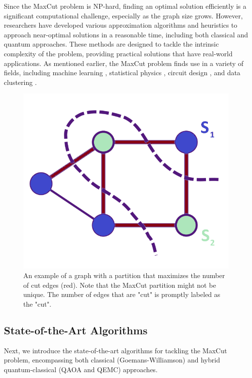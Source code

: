 Since the MaxCut problem is NP-hard, finding an optimal solution efficiently is a significant computational challenge, especially as the graph size grows. However, researchers have developed various approximation algorithms and heuristics to approach near-optimal solutions in a reasonable time, including both classical and quantum approaches. These methods are designed to tackle the intrinsic complexity of the problem, providing practical solutions that have real-world applications. As mentioned earlier, the MaxCut problem finds use in a variety of fields, including machine learning \cite{937505}, statistical physics \cite{Barahona_Grötschel_Jünger_Reinelt_1988}, circuit design \cite{Barahona_Grötschel_Jünger_Reinelt_1988}, and data clustering \cite{10.1007/11893318_21}.
 

\begin{figure}[H]
  \centering
  \includegraphics[width=1\columnwidth]{Figures/MaxCut.png}
  \caption{An example of a graph with a partition that maximizes the number of cut edges (red). Note that the MaxCut partition might not be unique. The number of edges that are "cut" is promptly labeled as the "cut".}
  \label{fig:MaxCut}
\end{figure}

\subsection{State-of-the-Art Algorithms}
\label{sec: SoA}
Next, we introduce the state-of-the-art algorithms for tackling the MaxCut problem, encompassing both classical (Goemans-Williamson) and hybrid quantum-classical (QAOA and QEMC) approaches.

